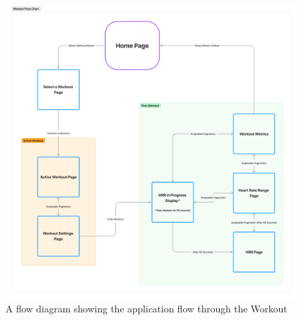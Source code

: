\documentclass{l4proj}
\begin{document}
\begin{figure}[h!]
    \centering
    \includegraphics[width=1\linewidth]{dissertation//dissImages/WorkoutFlow.pdf}
    \caption{A flow diagram showing the application flow through the Workout}
    \label{fig:workoutflow}
\end{figure}
\end{document}
